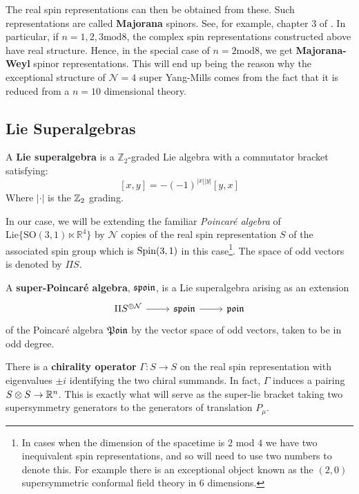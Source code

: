 		The real spin representations can then be obtained from these. Such representations are called \textbf{Majorana} spinors. See, for example, chapter 3 of \cite{meinrenken2013}. In particular, if $n = 1,2, 3 \mathrm{ mod } 8$, the complex spin representations constructed above have real structure. Hence, in the special case of $n=2 \mathrm{ mod } 8$, we get \textbf{Majorana-Weyl} spinor representations. This will end up being the reason why the exceptional structure of $\mathcal N=4$ super Yang-Mills comes from the fact that it is reduced from a $n=10$ dimensional theory.
		
		
		

	\subsection{Lie Superalgebras} %
	\label{sub:lie_superalgebras}

	\begin{defn}
	A \textbf{Lie superalgebra} is a $\mathbb Z_2$-graded Lie algebra with a commutator bracket satisfying:
		$$[x, y]= -(-1)^{|x||y|} [y, x]$$
	Where $|\cdot|$ is the $\mathbb{Z}_2$ grading.
	\end{defn}
	In our case, we will be extending the familiar \emph{Poincar\'e algebra} of $\mathrm{Lie}\{ \mathrm{SO}(3, 1) \ltimes \mathbb R^4  \}$ by $\mathcal N$ copies of the real spin representation $S$ of the associated spin group which is $\mathrm{Spin}(3,1)$ in this case\footnote{In cases when the dimension of the spacetime is $2$ mod $4$ we have two inequivalent spin representations, and so will need to use two numbers to denote this. For example there is an exceptional object known as the $(2,0)$ supersymmetric conformal field theory in 6 dimensions.}. The space of odd vectors is denoted by $\Pi S$.
	\begin{defn}
		A \textbf{super-Poincar\'e algebra}, $\frak{spoin}$, is a Lie superalgebra arising as an extension
		\[
			\begin{tikzcd}
				\Pi S^{\oplus \mathcal N} \arrow[r] & \frak{spoin} \arrow[r] & \frak{poin}
			\end{tikzcd}
		\]
		of the Poincar\'e algebra $\frak{Poin}$ by the vector space of odd vectors, taken to be in odd degree.
	\end{defn}
	
	There is a \textbf{chirality operator} $\Gamma: S \to S$ on the real spin representation with eigenvalues $\pm i$ identifying the two chiral summands. In fact, $\Gamma$ induces a pairing $S \otimes S \to \mathbb{R}^n$. This is exactly what will serve as the super-lie bracket taking two supersymmetry generators to the generators of translation $P_\mu$.
	
